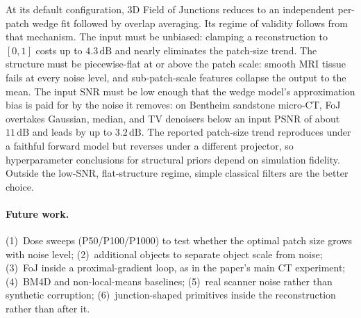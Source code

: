 \documentclass[11pt]{article}
\newcommand{\dB}{\,\mathrm{dB}}
\begin{document}
At its default configuration, 3D Field of Junctions reduces to an
independent per-patch wedge fit followed by overlap averaging. Its regime
of validity follows from that mechanism. The input must be unbiased:
clamping a reconstruction to $[0,1]$ costs up to $4.3\dB$ and nearly
eliminates the patch-size trend. The structure must be piecewise-flat at
or above the patch scale: smooth MRI tissue fails at every noise level,
and sub-patch-scale features collapse the output to the mean. The input
SNR must be low enough that the wedge model's approximation bias is paid
for by the noise it removes: on Bentheim sandstone micro-CT, FoJ
overtakes Gaussian, median, and TV denoisers below an input PSNR of about
$11\dB$ and leads by up to $3.2\dB$. The reported patch-size trend
reproduces under a faithful forward model but reverses under a different
projector, so hyperparameter conclusions for structural priors depend on
simulation fidelity. Outside the low-SNR, flat-structure regime, simple
classical filters are the better choice.

\paragraph{Future work.}
(1)~Dose sweeps (P50/P100/P1000) to test whether the optimal patch size
grows with noise level; (2)~additional objects to separate object scale
from noise; (3)~FoJ inside a proximal-gradient loop, as in the paper's
main CT experiment; (4)~BM4D and non-local-means baselines; (5)~real
scanner noise rather than synthetic corruption; (6)~junction-shaped
primitives inside the reconstruction rather than after it.
\end{document}

